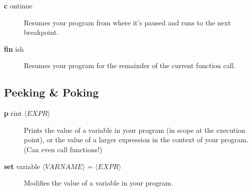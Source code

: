 \documentclass[11pt]{article}
\newcommand\dbc[2]{{%
  \sffamily\upshape\mdseries
  \textbf{\textcolor{Abbreviation} {#1}}%
  #2}}
\newcommand\abw[1]{$\langle\mathit{#1}\rangle$}
\begin{document}
\begin{multicols}{2}
\begin{description}
  \item[\dbc{c}{ontinue}] Resumes your program from where it’s paused
    and runs to the next breakpoint.

  \item[\dbc{fin}{ish}] Resumes your program for the remainder of the
    current function call.

\end{description}

\subsection*{Peeking \& Poking}
\begin{description}

  \item[\dbc{p}{rint} \abw{EXPR}] Prints the value of a variable in your
    program (in scope at the execution point), or the value of a larger
    expression in the context of your program. (Can even call
    functions!)

  \item[\dbc{set}{ variable} \abw{VARNAME} = \abw{EXPR}] Modifies the
    value of a variable in your program.

\end{description}

\end{multicols}
\end{document}
